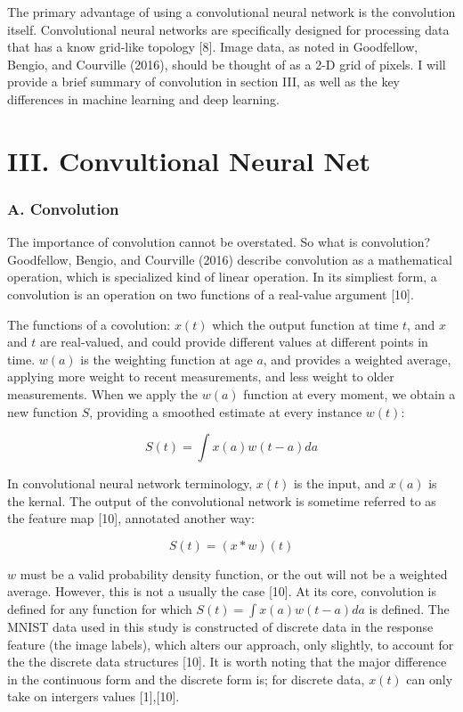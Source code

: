 \documentclass[conference,final,]{IEEEtran}
\begin{document}
The primary advantage of using a convolutional neural network is the
convolution itself. Convolutional neural networks are specifically
designed for processing data that has a know grid-like topology {[}8{]}.
Image data, as noted in Goodfellow, Bengio, and Courville (2016), should
be thought of as a 2-D grid of pixels. I will provide a brief summary of
convolution in section III, as well as the key differences in machine
learning and deep learning.

\section{III. Convultional Neural
Net}\label{iii.-convultional-neural-net}

\subsubsection{A. Convolution}\label{a.-convolution}

The importance of convolution cannot be overstated. So what is
convolution? Goodfellow, Bengio, and Courville (2016) describe
convolution as a mathematical operation, which is specialized kind of
linear operation. In its simpliest form, a convolution is an operation
on two functions of a real-value argument {[}10{]}.

The functions of a covolution: \(x(t)\) which the output function at
time \(t\), and \(x\) and \(t\) are real-valued, and could provide
different values at different points in time. \(w(a)\) is the weighting
function at age \(a\), and provides a weighted average, applying more
weight to recent measurements, and less weight to older measurements.
When we apply the \(w(a)\) function at every moment, we obtain a new
function \(S\), providing a smoothed estimate at every instance
\(w(t)\):

\begin{equation}
    S(t) = \int x(a)w(t-a)da
\end{equation}

In convolutional neural network terminology, \(x(t)\) is the input, and
\(x(a)\) is the kernal. The output of the convolutional network is
sometime referred to as the feature map {[}10{]}, annotated another way:

\begin{equation}
    S(t) =  (x*w)(t)
\end{equation}

\(w\) must be a valid probability density function, or the out will not
be a weighted average. However, this is not a usually the case {[}10{]}.
At its core, convolution is defined for any function for which
\(S(t)=\int x(a)w(t-a)da\) is defined. The MNIST data used in this study
is constructed of discrete data in the response feature (the image
labels), which alters our approach, only slightly, to account for the
the discrete data structures {[}10{]}. It is worth noting that the major
difference in the continuous form and the discrete form is; for discrete
data, \(x(t)\) can only take on intergers values {[}1{]},{[}10{]}.
\end{document}
